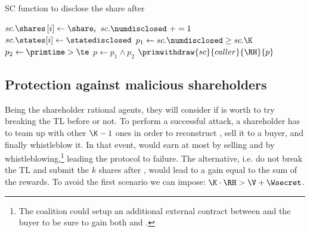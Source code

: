 
\begin{algorithm}[t]
	\caption{SC function to disclose the share after \td}\label{algo:disclose}
	\begin{algorithmic}[1]
		\vspace{0.6em}
		\State $sc.\shares \left[ i \right] \gets \share_{i}$
		\State $sc.\numdisclosed\ += 1$
		\State $sc.\states[i]\gets \statedisclosed$
		\State $p_1 \gets sc.\numdisclosed \ge sc.\K$
		\State $p_2 \gets \primtime > \te$
		\State $p \gets p_1 \wedge p_2$
		\State $\primwithdraw{sc}{caller}{\RH}{p}$
		\EndIf
		\EndIf
		\EndIf
		\EndProcedure
	\end{algorithmic}
\end{algorithm}

\subsection{Protection against malicious shareholders}\label{sect:mal_sha}

Being the shareholder rational agents, they will consider if is worth to try breaking the TL before \td or not.
To perform a successful attack, a shareholder has to team up with other $\K - 1$ ones in order to reconstruct \secret, sell it to a buyer, and finally whistleblow it.
In that event, \coalition would earn at most by selling and by whistleblowing,\footnote{The coalition \coalition could setup an additional external contract between \coalition and the buyer to be sure to gain both \V and \Wsecret.} leading the protocol to failure. 
The alternative, i.e. do not break the TL and submit the $k$ shares after \td, would lead to a gain equal to the sum of the rewards. 
To avoid the first scenario we can impose:
%
$\K \cdot \RH  > \V + \Wsecret$.

